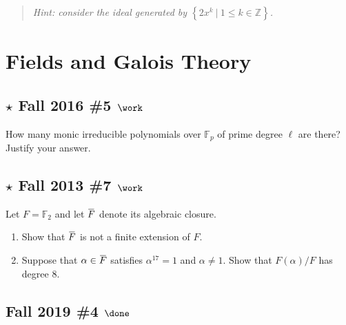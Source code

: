 \begin{quote}
\emph{Hint: consider the ideal generated by
\(\left\{{ 2x^k {~\mathrel{\Big|}~}1\leq k \in {\mathbb{Z}}}\right\}\).}
\end{quote}

\hypertarget{fields-and-galois-theory}{%
\section{Fields and Galois Theory}\label{fields-and-galois-theory}}

\hypertarget{star-fall-2016-5-work}{%
\subsection{\texorpdfstring{\(\star\) Fall 2016 \#5
\(\work\)}{\textbackslash star Fall 2016 \#5 \textbackslash work}}\label{star-fall-2016-5-work}}

How many monic irreducible polynomials over \({\mathbb{F}}_p\) of prime
degree \(\ell\) are there? Justify your answer.

\hypertarget{star-fall-2013-7-work}{%
\subsection{\texorpdfstring{\(\star\) Fall 2013 \#7
\(\work\)}{\textbackslash star Fall 2013 \#7 \textbackslash work}}\label{star-fall-2013-7-work}}

Let \(F = {\mathbb{F}}_2\) and let
\(\mkern 1.5mu\overline{\mkern-1.5muF\mkern-1.5mu}\mkern 1.5mu\) denote
its algebraic closure.

\begin{enumerate}
\def\labelenumi{\alph{enumi}.}
\item
  Show that
  \(\mkern 1.5mu\overline{\mkern-1.5muF\mkern-1.5mu}\mkern 1.5mu\) is
  not a finite extension of \(F\).
\item
  Suppose that
  \(\alpha \in \mkern 1.5mu\overline{\mkern-1.5muF\mkern-1.5mu}\mkern 1.5mu\)
  satisfies \(\alpha^{17} = 1\) and \(\alpha\neq 1\). Show that
  \(F(\alpha)/F\) has degree 8.
\end{enumerate}

\hypertarget{fall-2019-4-done}{%
\subsection{\texorpdfstring{Fall 2019 \#4
\(\done\)}{Fall 2019 \#4 \textbackslash done}}\label{fall-2019-4-done}}

